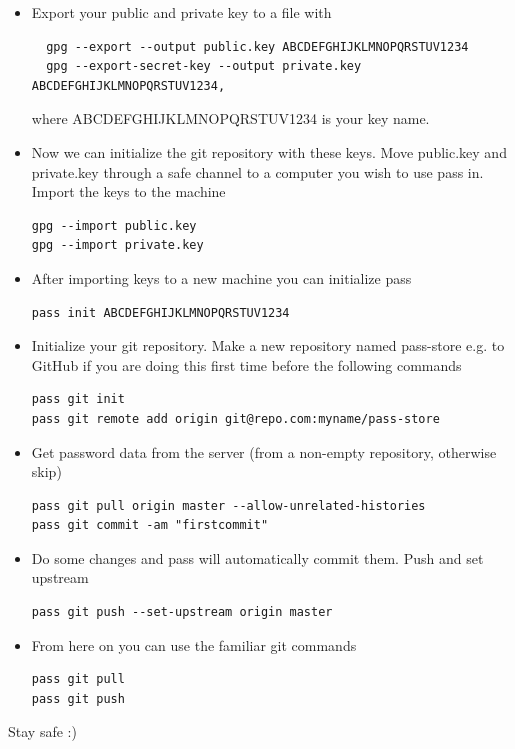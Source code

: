 \documentclass{article}
\begin{document}
\begin{itemize}
\item Export your public and private key to a file with \\
\begin{verbatim}
  gpg --export --output public.key ABCDEFGHIJKLMNOPQRSTUV1234 
  gpg --export-secret-key --output private.key ABCDEFGHIJKLMNOPQRSTUV1234,
\end{verbatim}
where ABCDEFGHIJKLMNOPQRSTUV1234 is your key name.\\
\item Now we can initialize the git repository with these keys. Move public.key and private.key through a safe channel to a computer you wish to use pass in. Import the keys to the machine \\
\begin{verbatim}
gpg --import public.key
gpg --import private.key
\end{verbatim}
\item After importing keys to a new machine you can initialize pass
\begin{verbatim}
pass init ABCDEFGHIJKLMNOPQRSTUV1234
\end{verbatim}

\item Initialize your git repository. Make a new repository named pass-store e.g. to GitHub if you are doing this first time before the following commands\\
\begin{verbatim}
pass git init 
pass git remote add origin git@repo.com:myname/pass-store
 \end{verbatim}
\item Get password data from the server (from a non-empty repository, otherwise skip)
\begin{verbatim}
pass git pull origin master --allow-unrelated-histories
pass git commit -am "firstcommit"
\end{verbatim}
\item Do some changes and pass will automatically commit them. Push and set upstream \\
\begin{verbatim}
pass git push --set-upstream origin master 
\end{verbatim}
\item From here on you can use the familiar git commands \\
\begin{verbatim}
pass git pull 
pass git push 
\end{verbatim}
\end{itemize}
Stay safe :)
\end{document}
